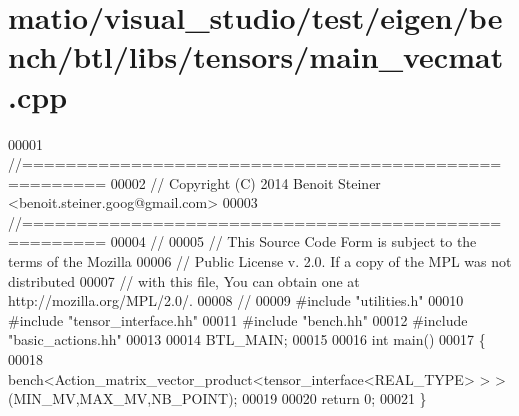 \hypertarget{matio_2visual__studio_2test_2eigen_2bench_2btl_2libs_2tensors_2main__vecmat_8cpp_source}{}\section{matio/visual\+\_\+studio/test/eigen/bench/btl/libs/tensors/main\+\_\+vecmat.cpp}
\label{matio_2visual__studio_2test_2eigen_2bench_2btl_2libs_2tensors_2main__vecmat_8cpp_source}

\begin{DoxyCode}
00001 \textcolor{comment}{//=====================================================}
00002 \textcolor{comment}{// Copyright (C) 2014 Benoit Steiner <benoit.steiner.goog@gmail.com>}
00003 \textcolor{comment}{//=====================================================}
00004 \textcolor{comment}{//}
00005 \textcolor{comment}{// This Source Code Form is subject to the terms of the Mozilla}
00006 \textcolor{comment}{// Public License v. 2.0. If a copy of the MPL was not distributed}
00007 \textcolor{comment}{// with this file, You can obtain one at http://mozilla.org/MPL/2.0/.}
00008 \textcolor{comment}{//}
00009 \textcolor{preprocessor}{#include "utilities.h"}
00010 \textcolor{preprocessor}{#include "tensor\_interface.hh"}
00011 \textcolor{preprocessor}{#include "bench.hh"}
00012 \textcolor{preprocessor}{#include "basic\_actions.hh"}
00013 
00014 BTL\_MAIN;
00015 
00016 \textcolor{keywordtype}{int} main()
00017 \{
00018   bench<Action\_matrix\_vector\_product<tensor\_interface<REAL\_TYPE> > >(MIN\_MV,MAX\_MV,NB\_POINT);
00019 
00020   \textcolor{keywordflow}{return} 0;
00021 \}
\end{DoxyCode}
